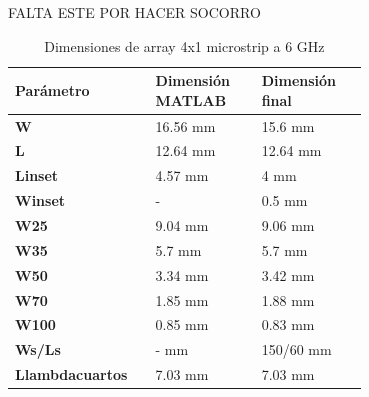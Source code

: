 FALTA ESTE POR HACER SOCORRO

\begin{table}[H]
  
   \label{tab:array4x12}
   \small %
   \centering %
   \begin{tabular}{m{0.2\linewidth}m{0.25\linewidth}m{0.25\linewidth}} %
   \toprule[\heavyrulewidth]\toprule[\heavyrulewidth]
   \textbf{Parámetro} & \textbf{Dimensión MATLAB} & \textbf{Dimensión final} \\ 
   \midrule
   \textbf{W} & 16.56 mm & 15.6 mm \\
   \textbf{L} & 12.64 mm & 12.64 mm\\
   \textbf{Linset} & 4.57 mm & 4 mm\\
   \textbf{Winset} & - & 0.5 mm\\
   \textbf{W25} & 9.04 mm & 9.06 mm\\
   \textbf{W35} & 5.7 mm & 5.7 mm\\
   \textbf{W50} & 3.34 mm & 3.42 mm\\
   \textbf{W70} & 1.85 mm & 1.88 mm\\
   \textbf{W100} & 0.85 mm & 0.83 mm\\
   \textbf{Ws/Ls} & - mm & 150/60 mm\\
   \textbf{Llambdacuartos} & 7.03 mm & 7.03 mm\\
   \bottomrule[\heavyrulewidth] 
   \end{tabular}
   \caption{Dimensiones de array 4x1 microstrip a 6 GHz} 
\end{table}




